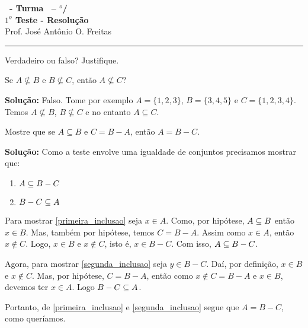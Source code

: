 \documentclass[12pt]{exam}
\begin{document}
\begin{center}
{\Large\bf \disciplina\ - Turma \turma\ -- \semestre$^{o}$/\ano} \\ \vspace{9pt} {\large\bf
$1^{\underline{o}}$ Teste - Resolu\c{c}\~ao}\\
\vspace{9pt} Prof. Jos{\'e} Ant{\^o}nio O. Freitas
\end{center}
\hrule

\vspace{.6cm}


\vspace{.6cm}

\questao Verdadeiro ou falso? Justifique.
\begin{center}
    Se $A \nsubseteq B$ e $B \nsubseteq C$, ent\~ao $A \nsubseteq C$?
\end{center}

\noindent\textbf{Solu\c{c}\~ao:} Falso. Tome por exemplo $A = \{1, 2, 3\}$, $B = \{3, 4, 5\}$ e $C = \{1, 2, 3, 4\}$. Temos $A \nsubseteq B$, $B \nsubseteq C$ e no entanto $A \subseteq C$.

\vspace{.5cm}

\questao Mostre que se $A \subseteq B$ e $C = B - A$, ent\~ao $A = B - C$.

\noindent\textbf{Solu\c{c}\~ao:} Como a teste envolve uma igualdade de conjuntos precisamos mostrar que:
\begin{enumerate}
    \item $A \subseteq B - C$\label{primeira_inclusao}
    \item $B - C \subseteq A$\label{segunda_inclusao}
\end{enumerate}

Para mostrar \eqref{primeira_inclusao} seja $x \in A$. Como, por hipótese, $A \subseteq B$ então $x \in B$. Mas, também por hipótese, temos $C = B - A$. Assim como $x \in A$, então $x \notin C$. Logo, $x \in B$ e $x \notin C$, isto é, $x \in B - C$. Com isso, $A \subseteq B - C$.

Agora, para mostrar \eqref{segunda_inclusao} seja $y \in B - C$. Daí, por definição, $x \in B$ e $x \notin C$. Mas, por hipótese, $C = B - A$, então como $x \notin C = B - A$ e $x \in B$, devemos ter $x \in A$. Logo $B - C \subseteq A$.

Portanto, de \eqref{primeira_inclusao} e \eqref{segunda_inclusao} segue que $A = B - C$, como queríamos.
\end{document}
